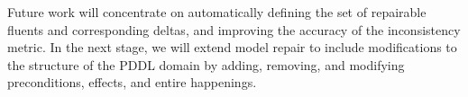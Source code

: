 \documentclass[letterpaper]{article} %
\begin{document}
Future work will concentrate on automatically defining the set of repairable fluents and corresponding deltas, and improving the accuracy of the inconsistency metric. In the next stage, we will extend model repair to include modifications to the structure of the PDDL domain by adding, removing, and modifying preconditions, effects, and entire happenings.




\end{document}
